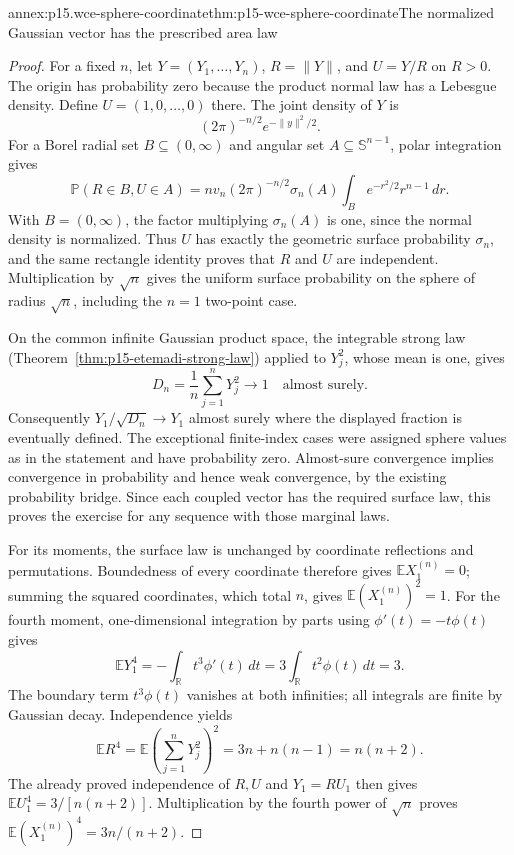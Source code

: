\begin{annexitem}{annex:p15.wce-sphere-coordinate}{thm:p15-wce-sphere-coordinate}{The normalized Gaussian vector has the prescribed area law}
\begin{proof}
For a fixed \(n\), let \(Y=(Y_1,\ldots,Y_n)\),
\(R=\|Y\|\), and \(U=Y/R\) on \(R>0\).
The origin has probability zero because the product normal law
has a Lebesgue density. Define \(U=(1,0,\ldots,0)\) there.
The joint density of \(Y\) is
\[
 (2\pi)^{-n/2}e^{-\|y\|^2/2}.
 \]
For a Borel radial set \(B\subseteq(0,\infty)\) and
angular set \(A\subseteq\mathbb S^{n-1}\), polar integration gives
\[
 \mathbb P(R\in B,U\in A)
 =n v_n(2\pi)^{-n/2}\sigma_n(A)
                    \int_B e^{-r^2/2}r^{n-1}\,dr.
 \]
With \(B=(0,\infty)\), the factor multiplying \(\sigma_n(A)\)
is one, since the normal density is normalized.
Thus \(U\) has exactly the geometric surface probability
\(\sigma_n\), and the same rectangle identity proves that
\(R\) and \(U\) are independent.
Multiplication by \(\sqrt n\) gives the uniform surface
probability on the sphere of radius \(\sqrt n\), including
the \(n=1\) two-point case.

On the common infinite Gaussian product space, the integrable
strong law (Theorem~\ref{thm:p15-etemadi-strong-law}) applied
to \(Y_j^2\), whose mean is one, gives
\[
 D_n=\frac1n\sum_{j=1}^nY_j^2\longrightarrow1
                                            \quad\text{almost surely}.
 \]
Consequently \(Y_1/\sqrt{D_n}\to Y_1\) almost surely
where the displayed fraction is eventually defined.
The exceptional finite-index cases were assigned sphere values
as in the statement and have probability zero.
Almost-sure convergence implies convergence in probability
and hence weak convergence, by the existing probability bridge.
Since each coupled vector has the required surface law, this
proves the exercise for any sequence with those marginal laws.

For its moments, the surface law is unchanged by coordinate
reflections and permutations. Boundedness of every coordinate
therefore gives \(\mathbb EX^{(n)}_1=0\); summing the
squared coordinates, which total \(n\), gives
\(\mathbb E(X^{(n)}_1)^2=1\).
For the fourth moment, one-dimensional integration by parts
using \(\phi'(t)=-t\phi(t)\) gives
\[
 \mathbb EY_1^4=-\int_{\mathbb R}t^3\phi'(t)\,dt
       =3\int_{\mathbb R}t^2\phi(t)\,dt=3.
 \]
The boundary term \(t^3\phi(t)\) vanishes at both infinities;
all integrals are finite by Gaussian decay.
Independence yields
\[
 \mathbb ER^4
 =\mathbb E\left(\sum_{j=1}^nY_j^2\right)^2
 =3n+n(n-1)=n(n+2).
 \]
The already proved independence of \(R,U\) and \(Y_1=R U_1\)
then gives
\(\mathbb EU_1^4=3/[n(n+2)]\).
Multiplication by the fourth power of \(\sqrt n\) proves
\(\mathbb E(X^{(n)}_1)^4=3n/(n+2)\).
\end{proof}
\end{annexitem}

